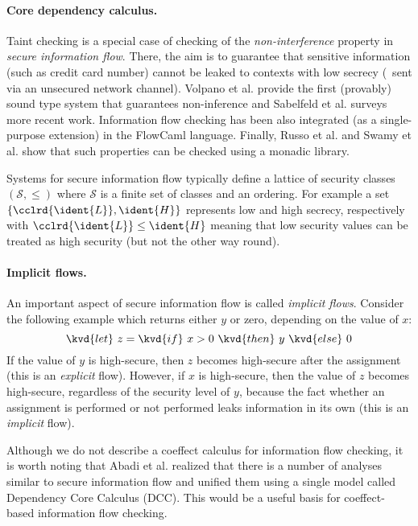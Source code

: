 
\paragraph{Core dependency calculus.}
Taint checking is a special case of checking of the \emph{non-interference} property
in \emph{secure information flow}. There, the aim is to guarantee that sensitive information (such
as credit card number) cannot be leaked to contexts with low secrecy (\eg~sent via an unsecured
network channel). Volpano et al. \cite{app-secure-flow} provide the first (provably) sound type
system that guarantees non-inference and Sabelfeld et al. \cite{app-secure-information-flow} surveys
more recent work. Information flow checking has been also integrated (as a single-purpose
extension) in the FlowCaml \cite{app-security-flowcaml} language. Finally, Russo et al. and
Swamy et al. \cite{monad-secure-flow,monads-lightweight-ml} show that such properties can be checked
using a monadic library.

Systems for secure information flow typically define a lattice of security classes $(\mathcal{S}, \leq)$
where $\mathcal{S}$ is a finite set of classes and an ordering. For example a set $\{\cclrd{\ident{L}}, \ident{H}\}$
represents low and high secrecy, respectively with $\cclrd{\ident{L}} \leq \ident{H}$ meaning that low security
values can be treated as high security (but not the other way round).

\paragraph{Implicit flows.}
An important aspect of secure information flow is called \emph{implicit flows}. Consider the following
example which returns either $y$ or zero, depending on the value of $x$:
%
\begin{equation*}
\kvd{let}~z = \kvd{if}~x>0~\kvd{then}~y~\kvd{else}~0
\end{equation*}
%
If the value of $y$ is high-secure, then $z$ becomes high-secure after the assignment
(this is an \emph{explicit} flow). However, if $x$ is high-secure, then the value of
$z$ becomes high-secure, regardless of the security level of $y$, because the fact whether an
assignment is performed or not performed leaks information in its own (this is an
\emph{implicit} flow).

Although we do not describe a coeffect calculus for information flow checking, it is worth noting
that Abadi et al. \cite{app-dcc} realized that there is a number of analyses similar to secure information
flow and unified them using a single model called Dependency Core Calculus (DCC). This would be
a useful basis for coeffect-based information flow checking.

